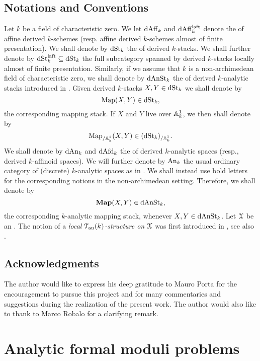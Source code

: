 \documentclass[10pt,a4paper,reqno]{amsart} %
\theoremstyle{plain}
\theoremstyle{definition}
\theoremstyle{remark}
\numberwithin{equation}{section}
\begin{document}
\subsection{Notations and Conventions} Let $k$ be a field of characteristic zero. We let $\mathrm{dAff}_k$ and $\mathrm{dAff}_k^{\mathrm{laft}}$ denote
the \infcats of affine derived $k$-schemes (resp. affine derived $k$-schemes almost of finite presentation).
We shall denote by $\mathrm{dSt}_k$ the \infcat of derived $k$-stacks. 
We shall further denote by $\mathrm{dSt}^{\mathrm{laft}}_k \subseteq \mathrm{dSt}_k$ the full subcategory spanned by derived $k$-stacks locally almost of finite presentation. Similarly,
if we assume that $k$ is a non-archimedean field of characteristic zero, we shall denote by $\mathrm{dAnSt}_k$ the \infcat of derived $k$-analytic stacks introduced in \cite{Porta_Yu_Derived_non-archimedean_analytic_spaces}.
Given derived $k$-stacks $X, Y \in \mathrm{dSt}_k$ we shall denote by
    \[
        \operatorname{Map}(X, Y) \in \mathrm{dSt}_k,    
    \]
the corresponding mapping stack. If $X$ and $Y$ live over $\mathbb A_k^1$, we then shall denote by
    \[
        \operatorname{Map}_{/ \mathbb A^1_k}(X, Y) \in (\mathrm{dSt}_k)_{/ \mathbb A^1_k}.  
    \]
We shall denote by $\mathrm{dAn}_k$ and $\mathrm{dAfd}_k$ the \infcats of derived $k$-analytic spaces (resp., derived $k$-affinoid spaces). We will
further denote by $\mathrm{An}_k$ the usual ordinary category of (discrete) $k$-analytic spaces as in \cite{Berkovich_Etale_1993}.
We shall instead use bold letters for the corresponding notions in the non-archimedean setting. Therefore, we shall denote by
    \[
        \mathbf{Map}(X, Y) \in \mathrm{dAnSt}_k,
    \]
the corresponding $k$-analytic mapping stack, whenever $X, Y \in \mathrm{dAnSt}_k$.
Let $\mathcal X$ be an \inftopos. The notion of a \emph{local $\mathcal T_{\mathrm{an}}(k)$-structure on $\mathcal X$} was first introduced in \cite[Definition 2.4]{Porta_Yu_Derived_non-archimedean_analytic_spaces},
see also \cite[\S 2]{antonio2018p}.


\subsection{Acknowledgments} The author would like to express his deep gratitude to Mauro Porta for the encouragement to pursue this project and
for many commentaries and suggestions during the realization of the present work. The author would also like to thank to Marco Robalo for a clarifying
remark.

\section{Analytic formal moduli problems}
\end{document}
